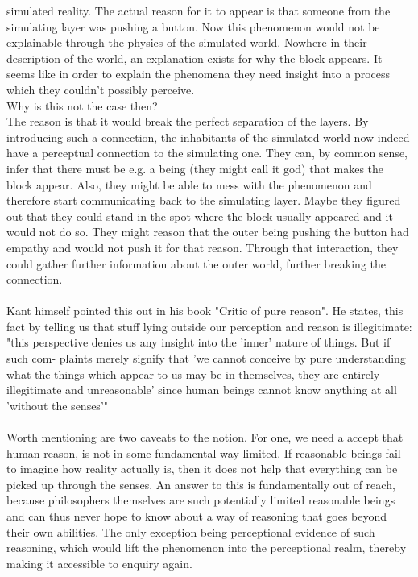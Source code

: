 \documentclass[fleqn,14pt]{article}
\begin{document}
simulated reality. The actual reason for it to appear is that someone from the simulating layer
was pushing a button. Now this phenomenon would not be explainable through the physics of the simulated world.
Nowhere in their description of the world, an explanation
exists for why the block appears. It seems like in order to explain the phenomena they need insight into
a process which they couldn't possibly perceive. \\
Why is this not the case then? \\
The reason is that it would break the perfect separation of the layers. By introducing such
a connection, the inhabitants of the simulated world now indeed have a perceptual connection to the simulating
one. They can, by common sense, infer that there must be e.g. a being (they might call it god) that
makes the block appear. Also, they might be able to mess with the phenomenon and therefore start communicating
back to the simulating layer. Maybe they figured out that they could stand in the spot where
the block usually appeared and it would not do so. They might reason that the outer being pushing the button 
had empathy and would not push it for that reason. Through that interaction, they could gather further information
about the outer world, further breaking the connection. \\
\\
Kant himself pointed this out in his book "Critic of pure reason". He states, this fact by telling
us that stuff lying outside our perception and reason is illegitimate: "this perspective
denies us any insight into the 'inner' nature of things. But if such com-
plaints merely signify that 'we cannot conceive by pure understanding
what the things which appear to us may be in themselves, they are
entirely illegitimate and unreasonable' since human beings cannot
know anything at all 'without the senses'"\cite[p.49]{otfried} \\
\\
Worth mentioning are two caveats to the notion. For one, we need a accept that human reason,
is not in some fundamental way limited. If reasonable
beings fail to imagine how reality actually is, then it does not help that everything
can be picked up through the senses. An answer to this is fundamentally out of reach, because
philosophers themselves are such potentially limited reasonable beings and can thus never hope
to know about a way of reasoning that goes beyond their own abilities. The only exception being
perceptional evidence of such reasoning, which would lift the phenomenon into the perceptional realm,
thereby making it accessible to enquiry again. \\
\end{document}
